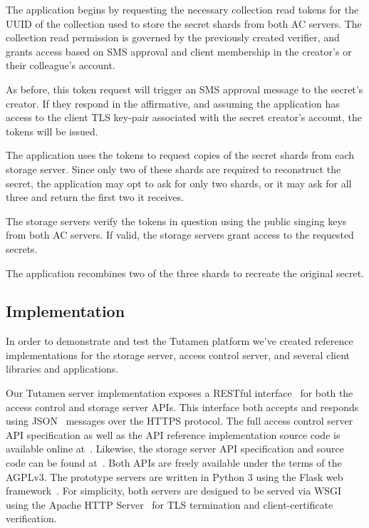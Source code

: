 \begin{packed_enum}
\item The application begins by requesting the necessary collection
  read tokens for the UUID of the collection used to store the secret
  shards from both AC servers. The collection read permission is
  governed by the previously created verifier, and grants access based
  on SMS approval and client membership in the creator's or their
  colleague's account.
\item As before, this token request will trigger an SMS approval
  message to the secret's creator. If they respond in the affirmative,
  and assuming the application has access to the client TLS key-pair
  associated with the secret creator's account, the tokens will be
  issued.
\item The application uses the tokens to request copies of the secret
  shards from each storage server. Since only two of these shards are
  required to reconstruct the secret, the application may opt to ask
  for only two shards, or it may ask for all three and return the
  first two it receives.
\item The storage servers verify the tokens in question using the
  public singing keys from both AC servers. If valid, the storage
  servers grant access to the requested secrets.
\item The application recombines two of the three shards to recreate
  the original secret.
\end{packed_enum}

\subsection{Implementation}

In order to demonstrate and test the Tutamen platform we've created
reference implementations for the storage server, access control
server, and several client libraries and applications.

Our Tutamen server implementation exposes a RESTful
interface~\cite{fielding2000} for both the access control and storage
server APIs. This interface both accepts and responds using
JSON~\cite{json} messages over the HTTPS protocol. The full access
control server API specification as well as the API reference
implementation source code is available online
at~\cite{src-tutamen-apiaccesscontrol}. Likewise, the storage server
API specification and source code can be found
at~\cite{src-tutamen-apistorage}. Both APIs are freely available under
the terms of the AGPLv3. The prototype servers are written in Python 3 using
the Flask web framework~\cite{python-flask}. For
simplicity, both servers are designed
to be served via WSGI~\cite{pep3333} using the Apache HTTP
Server~\cite{apache} for TLS termination and client-certificate
verification.

